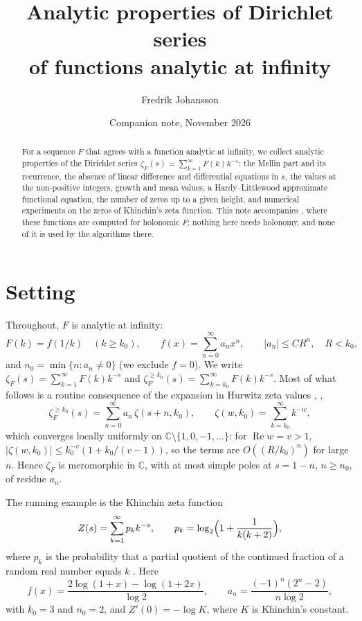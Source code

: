 \documentclass[11pt,reqno]{amsart}
\title[Analytic properties of Dirichlet series]{Analytic properties of Dirichlet series\\ of functions analytic at infinity}
\author{Fredrik Johansson}
\date{Companion note, November 2026}
\theoremstyle{definition}
\theoremstyle{remark}
\newcommand{\CC}{\mathbb{C}}
\begin{document}
\begin{abstract}
For a sequence $F$ that agrees with a function analytic at infinity, we collect analytic properties of the Dirichlet
series $\zeta_F(s) = \sum_{k=1}^{\infty}F(k)k^{-s}$: the Mellin part and its recurrence, the absence of linear
difference and differential equations in $s$, the values at the non-positive integers, growth and mean values, a
Hardy--Littlewood approximate functional equation, the number of zeros up to a given height, and numerical
experiments on the zeros of Khinchin's zeta function. This note accompanies \cite{Joh26}, where these functions are
computed for holonomic $F$; nothing here needs holonomy, and none of it is used by the algorithms there.
\end{abstract}

\maketitle

\section{Setting}
Throughout, $F$ is analytic at infinity:
\begin{equation}\label{eq:f}
  F(k) = f(1/k) \quad (k \ge k_0), \qquad f(x) = \sum_{n=0}^{\infty}a_nx^n, \qquad |a_n| \le C R^n,
  \quad R < k_0,
\end{equation}
and $n_0 = \min\{n : a_n \ne 0\}$ (we exclude $f = 0$). We write $\zeta_F(s) = \sum_{k=1}^{\infty}F(k)k^{-s}$ and
$\zeta_F^{\ge k_0}(s) = \sum_{k=k_0}^{\infty}F(k)k^{-s}$. Most of what follows is a routine consequence of the expansion in
Hurwitz zeta values \cite{FV96}, \cite[Proposition~5.7]{Joh26},
\begin{equation}\label{eq:zetavalue}
  \zeta_F^{\ge k_0}(s) = \sum_{n=0}^{\infty}a_n\,\zeta(s+n,k_0), \qquad \zeta(w,k_0) = \sum_{k=k_0}^{\infty}k^{-w},
\end{equation}
which converges locally uniformly on $\CC \setminus \{1, 0, -1, \dots\}$: for $\operatorname{Re}w = v > 1$,
$|\zeta(w,k_0)| \le k_0^{-v}(1 + k_0/(v-1))$, so the terms are $O((R/k_0)^n)$ for large $n$. Hence $\zeta_F$ is
meromorphic in $\CC$, with at most simple poles at $s = 1-n$, $n \ge n_0$, of residue $a_n$.

The running example is the Khinchin zeta function
\[
  Z(s) = \sum_{k=1}^{\infty}p_kk^{-s}, \qquad p_k = \log_2\Bigl(1 + \frac1{k(k+2)}\Bigr),
\]
where $p_k$ is the probability that a partial quotient of the continued fraction of a random real number equals $k$
\cite{Khi35,Khi64}. Here
\[
  f(x) = \frac{2\log(1+x) - \log(1+2x)}{\log 2}, \qquad a_n = \frac{(-1)^n(2^n - 2)}{n\log 2},
\]
with $k_0 = 3$ and $n_0 = 2$, and $Z'(0) = -\log K$, where $K$ is Khinchin's constant.
\end{document}
